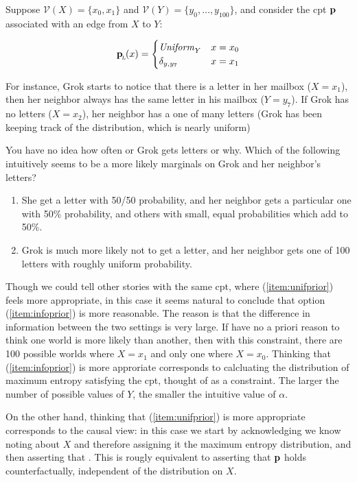 \documentclass{article}
\newcommand{\bp}[1][L]{\mat{p}_{\!_{#1}\!}}
\newcommand{\V}{\mathcal V}
\numberwithin{equation}{section}
\begin{document}
	\begin{example}\label{ex:alpha-motivation}
		Suppose $\V(X) = \{x_0, x_1\}$ and $\V(Y) = \{y_0, \ldots, y_100\}$, and consider the cpt $\mathbf p$ associated with an edge from $X$ to $Y$:
		
		\begin{equation}
			\bp(x) = \begin{cases}
				\mathit{Uniform}_Y & x = x_0 \\
				\delta_{y, y_7} & x = x_1
			\end{cases}
		\end{equation}

		For instance, Grok starts to notice that there is a letter in her mailbox ($X = x_1$), then her neighbor always has the same letter in his mailbox ($Y = y_7$). If Grok has no letters ($X = x_2$), her neighbor has a one of many letters (Grok has been keeping track of the distribution, which is nearly uniform)
		
		You have no idea how often or Grok gets letters or why. Which of the following intuitively seems to be a more likely marginals on Grok and her neighbor's letters?
		
		\begin{enumerate}
			\item She get a letter with 50/50 probability, and her neighbor gets a particular one with 50\% probability, and others with small, equal probabilities which add to 50\%. \label{item:unifprior}
			\item Grok is much more likely not to get a letter, and her neighbor gets one of 100 letters with roughly uniform probability. \label{item:infoprior}
		\end{enumerate}
		 	
				
		Though we could tell other stories with the same cpt,
                where (\ref{item:unifprior}) feels more appropriate,
                in this case it seems natural to conclude that option
                (\ref{item:infoprior}) is more reasonable. The reason
                is that the difference in information between the two
                settings is very large. If have no a priori reason to
                think one world is more likely than another, then with
                this constraint, there are 100 possible worlds where
                 $X = x_1$ and only one where $X = x_0$. Thinking that
                (\ref{item:infoprior}) is more approriate corresponds
                to calcluating the distribution of maximum entropy
                satisfying the cpt, thought of as a constraint. The
                larger the number of possible values of $Y$, the
                smaller the intuitive value of $\alpha$. 

		
		On the other hand, thinking that (\ref{item:unifprior}) is more appropriate corresponds to the causal view: in this case we start by acknowledging we know noting about $X$ and therefore assigning it the maximum entropy distribution, and then asserting that . This is rougly equivalent to asserting that $\mathbf p$ holds counterfactually, independent of the distribution on $X$. 
	\end{example}
	
\end{document}
